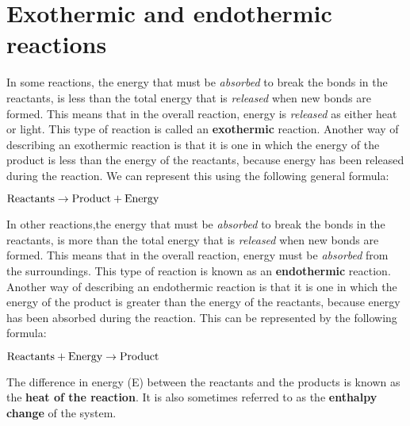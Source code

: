 
\section{Exothermic and endothermic reactions}
\label{sec:energychanges:exoendo}

In some reactions, the energy that must be \textit{absorbed} to break the bonds in the reactants, is less than 
the total energy that is \textit{released} when new bonds are formed. This means that in the overall reaction, energy is \textit{released} as either heat or light. This type of reaction is called an \textbf{exothermic} reaction. Another way of describing an exothermic reaction is that it is one in which the energy of the product is less than the energy of the reactants, because energy has been released during the reaction. We can represent this using the following general formula:

\begin{center}
$\rm{Reactants \rightarrow Product + Energy}$
\end{center}


In other reactions,the energy that must be \textit{absorbed} to break the bonds in the reactants, is more than 
the total energy that is \textit{released} when new bonds are formed. This means that in the overall reaction, energy must be \textit{absorbed} from the surroundings. This type of reaction is known as an \textbf{endothermic} reaction. Another way of describing an endothermic reaction is that it is one in which the energy of the product is greater than the energy of the reactants, because energy has been absorbed during the reaction. This can be represented by the following formula:

\begin{center}
$\rm{Reactants + Energy \rightarrow Product}$
\end{center} 


The difference in energy (E) between the reactants and the products is known as the \textbf{heat of the reaction}. It is also sometimes referred to as the \textbf{enthalpy change} of the system. 

